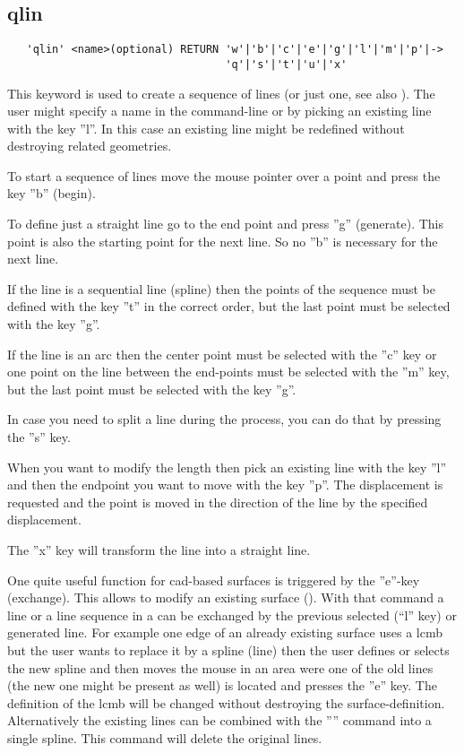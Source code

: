 \documentclass{article}
\begin{document}
\subsection{\label{qlin}qlin}
\begin{verbatim}
   'qlin' <name>(optional) RETURN 'w'|'b'|'c'|'e'|'g'|'l'|'m'|'p'|->
                                  'q'|'s'|'t'|'u'|'x'
\end{verbatim}
This keyword is used to create a sequence of lines (or just one, see also ). The user might specify a name in the command-line or by picking an existing line with the key ''l''. In this case an existing line might be redefined without destroying related geometries.

To start a sequence of lines move the mouse pointer over a point and press the key ''b'' (begin).

To define just a straight line go to the end point and press ''g'' (generate). This point is also the starting point for the next line. So no ''b'' is necessary for the next line.

If the line is a sequential line (spline) then the points of the sequence must be defined with the key ''t'' in the correct order, but the last point must be selected with the key ''g''.

If the line is an arc then the center point must be selected with the ''c'' key or one point on the line between the end-points must be selected with the ''m'' key, but the last point must be selected with the key ''g''.

In case you need to split a line during the process, you can do that by pressing the ''s'' key.

When you want to modify the length then pick an existing line with the key ''l'' and then the endpoint you want to move with the key ''p''. The displacement is requested and the point is moved in the direction of the line by the specified displacement. 

The ''x'' key will transform the line into a straight line.

One quite useful function for cad-based surfaces is triggered by the ''e''-key (exchange). This allows to modify an existing surface (). With that command a line or a line sequence in a  can be exchanged by the previous selected (``l'' key) or generated line. For example one edge of an already existing surface uses a lcmb but the user wants to replace it by a spline (line) then the user defines or selects the new spline and then moves the mouse in an area were one of the old lines (the new one might be present as well) is located and presses the ''e'' key. The definition of the lcmb will be changed without destroying the surface-definition. Alternatively the existing lines can be combined with the '''' command into a single spline. This command will delete the original lines.
\end{document}
